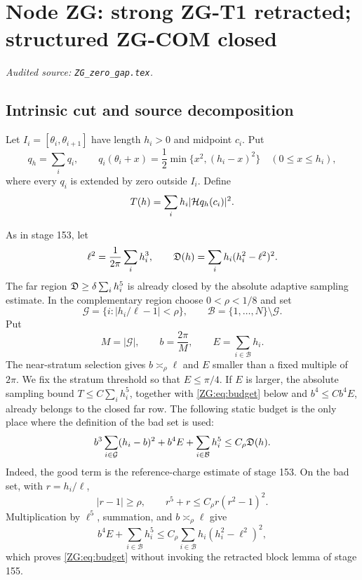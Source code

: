 \begingroup
\section{Node ZG: strong ZG-T1 retracted; structured ZG-COM closed}
\label{module:ZG}
\noindent\textit{Audited source: \nolinkurl{ZG_zero_gap.tex}.}
\subsection{Intrinsic cut and source decomposition}

Let $I_i=[\theta_i,\theta_{i+1}]$ have length $h_i>0$ and midpoint
$c_i$.  Put
\begin{equation}\label{ZG:eq:q}
 q_h=\sum_iq_i,
 \qquad
 q_i(\theta_i+x)=\frac12\min\{x^2,(h_i-x)^2\}
 \quad(0\le x\le h_i),
\end{equation}
where every $q_i$ is extended by zero outside $I_i$.  Define
\begin{equation}\label{ZG:eq:T}
 T(h)=\sum_i h_i|\mathcal H q_h(c_i)|^2.
\end{equation}

As in stage 153, let
\begin{equation}\label{ZG:eq:D}
 \ell^2=\frac1{2\pi}\sum_i h_i^3,
 \qquad
 \mathfrak D(h)=\sum_i h_i(h_i^2-\ell^2)^2.
\end{equation}
The far region $\mathfrak D\ge\delta\sum_i h_i^5$ is already closed by the
absolute adaptive sampling estimate.  In the complementary region choose
$0<\rho<1/8$ and set
\begin{equation}\label{ZG:eq:GB}
 \mathcal G=\{i:|h_i/\ell-1|<\rho\},
 \qquad \mathcal B=\{1,\ldots,N\}\setminus\mathcal G.
\end{equation}
Put
\begin{equation}\label{ZG:eq:bE}
 M=|\mathcal G|,\qquad b=\frac{2\pi}{M},\qquad
 E=\sum_{i\in\mathcal B}h_i.
\end{equation}
The near-stratum selection gives $b\asymp_\rho\ell$ and $E$ smaller than
a fixed multiple of $2\pi$.  We fix the stratum threshold so that
$E\le\pi/4$.  If $E$ is larger, the absolute sampling bound
$T\le C\sum_i h_i^5$, together with \eqref{ZG:eq:budget} below and
$b^4\le Cb^4E$, already belongs to the closed far row.  The following
static budget is the only
place where the definition of the bad set is used:
\begin{equation}\label{ZG:eq:budget}
 b^3\sum_{i\in\mathcal G}(h_i-b)^2
 +b^4E+\sum_{i\in\mathcal B}h_i^5
 \le C_\rho\mathfrak D(h).
\end{equation}
Indeed, the good term is the reference-charge estimate of stage 153.
On the bad set, with $r=h_i/\ell$,
\[
 |r-1|\ge\rho,
 \qquad r^5+r\le C_\rho r(r^2-1)^2.
\]
Multiplication by $\ell^5$, summation, and $b\asymp_\rho\ell$ give
\[
 b^4E+\sum_{i\in\mathcal B}h_i^5
 \le C_\rho\sum_{i\in\mathcal B}
 h_i(h_i^2-\ell^2)^2,
\]
which proves \eqref{ZG:eq:budget} without invoking the retracted block
lemma of stage 155.

